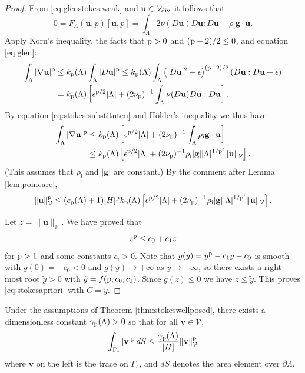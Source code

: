 \documentclass[hidelinks,onefignum,onetabnum,final]{siamart220329}  %
\newcommand{\eps}{\epsilon}
\newcommand{\grad}{\nabla}
\newcommand{\bg}{\mathbf{g}}
\newcommand{\bu}{\mathbf{u}}
\newcommand{\bv}{\mathbf{v}}
\newcommand{\cV}{\mathcal{V}}
\newcommand{\pp}{{\text{\textnormal{p}}}}
\newcommand{\rhoi}{\rho_{\text{i}}}
\newcommand{\Vdiv}{\cV_{\text{\textnormal{div}}}}
\begin{document}
\begin{proof}
From \eqref{eq:glenstokes:weak} and $\bu \in\Vdiv$ it follows that
\begin{equation}
0= F_\Lambda(\bu,p)[\bu,p] = \int_\Lambda 2 \nu(D\bu) D\bu : D\bu - \rhoi \bg \cdot \bu.  \label{eq:stokes:substituteu}
\end{equation}
Apply Korn's inequality, the facts that $\pp>0$ and $(\pp-2)/2 \le 0$, and equation \eqref{eq:glen}:
\begin{align}
\int_\Lambda |\grad\bu|^\pp &\le k_{\pp}(\Lambda) \int_\Lambda |D\bu|^\pp \le k_{\pp}(\Lambda) \int_\Lambda \left(|D\bu|^2 + \eps\right)^{(\pp-2)/2} \left(D\bu:D\bu + \eps\right) \label{eq:stokes:startapriori} \\
	&= k_{\pp}(\Lambda) \left[\eps^{\pp/2} |\Lambda| + (2 \nu_\pp)^{-1} \int_\Lambda \nu(D\bu) D\bu:D\bu\right]. \notag
\end{align}
By equation \eqref{eq:stokes:substituteu} and H\"older's inequality we thus have
\begin{align}
\int_\Lambda |\grad\bu|^\pp &\le k_{\pp}(\Lambda) \left[\eps^{\pp/2} |\Lambda| + (2 \nu_\pp)^{-1} \int_\Lambda \rhoi \bg \cdot \bu\right] \label{eq:stokes:workapriori} \\
	&\le k_{\pp}(\Lambda) \left[\eps^{\pp/2} |\Lambda| + (2 \nu_\pp)^{-1} \rhoi |\bg| |\Lambda|^{1/\pp'} \|\bu\|_\cV\right]. \notag
\end{align}
(This assumes that $\rhoi$ and $|\bg|$ are constant.)  By the comment after Lemma \ref{lem:poincare},
\begin{equation}
\|\bu\|_{\cV}^\pp \le (c_{\pp}(\Lambda) + 1) [H]^\pp k_{\pp}(\Lambda) \left[\eps^{\pp/2} |\Lambda| + (2 \nu_\pp)^{-1} \rhoi |\bg| |\Lambda|^{1/\pp'} \|\bu\|_\cV\right].
\end{equation}

Let $z=\|\bu\|_\cV$.  We have proved that
\begin{equation}
z^\pp \le c_0 + c_1 z
\end{equation}
for $\pp>1$ and some constants $c_i>0$.  Note that $g(y) = y^\pp - c_1 y - c_0$ is smooth with $g(0)=-c_0<0$ and $g(y) \to +\infty$ as $y \to +\infty$, so there exists a right-most root $\tilde y>0$ with $\tilde y = f(\pp,c_0,c_1)$.  Since $g(z)\le 0$ we have $z \le \tilde y$.  This proves \eqref{eq:stokesapriori} with $C=\tilde y$.
\end{proof}

\begin{lemma} \label{lem:trace}
Under the assumptions of Theorem \ref{thm:stokeswellposed}, there exists a dimensionless constant $\gamma_{\pp}(\Lambda)>0$ so that for all $\bv \in \cV$,
\begin{equation}
\int_{\Gamma_s} |\bv|^\pp \,dS \le \frac{\gamma_{\pp}(\Lambda)}{[H]} \|\bv\|_{\cV}^\pp \label{eq:trace}
\end{equation}
where $\bv$ on the left is the trace on $\Gamma_s$, and $dS$ denotes the area element over $\partial\Lambda$.
\end{lemma}
\end{document}
